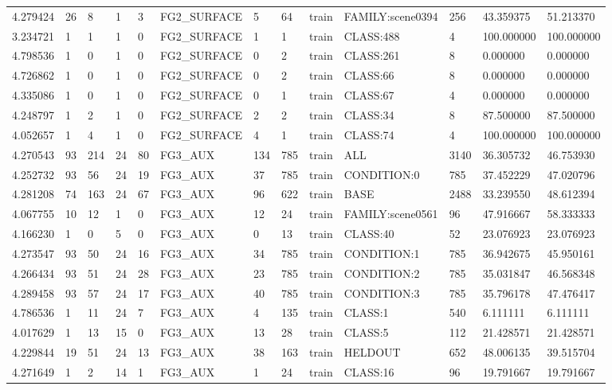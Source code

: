 \begin{tabular}{lllllllllllll}
4.279424 & 26 & 8 & 1 & 3 & FG2\_SURFACE & 5 & 64 & train & FAMILY:scene0394 & 256 & 43.359375 & 51.213370 \\
3.234721 & 1 & 1 & 1 & 0 & FG2\_SURFACE & 1 & 1 & train & CLASS:488 & 4 & 100.000000 & 100.000000 \\
4.798536 & 1 & 0 & 1 & 0 & FG2\_SURFACE & 0 & 2 & train & CLASS:261 & 8 & 0.000000 & 0.000000 \\
4.726862 & 1 & 0 & 1 & 0 & FG2\_SURFACE & 0 & 2 & train & CLASS:66 & 8 & 0.000000 & 0.000000 \\
4.335086 & 1 & 0 & 1 & 0 & FG2\_SURFACE & 0 & 1 & train & CLASS:67 & 4 & 0.000000 & 0.000000 \\
4.248797 & 1 & 2 & 1 & 0 & FG2\_SURFACE & 2 & 2 & train & CLASS:34 & 8 & 87.500000 & 87.500000 \\
4.052657 & 1 & 4 & 1 & 0 & FG2\_SURFACE & 4 & 1 & train & CLASS:74 & 4 & 100.000000 & 100.000000 \\
4.270543 & 93 & 214 & 24 & 80 & FG3\_AUX & 134 & 785 & train & ALL & 3140 & 36.305732 & 46.753930 \\
4.252732 & 93 & 56 & 24 & 19 & FG3\_AUX & 37 & 785 & train & CONDITION:0 & 785 & 37.452229 & 47.020796 \\
4.281208 & 74 & 163 & 24 & 67 & FG3\_AUX & 96 & 622 & train & BASE & 2488 & 33.239550 & 48.612394 \\
4.067755 & 10 & 12 & 1 & 0 & FG3\_AUX & 12 & 24 & train & FAMILY:scene0561 & 96 & 47.916667 & 58.333333 \\
4.166230 & 1 & 0 & 5 & 0 & FG3\_AUX & 0 & 13 & train & CLASS:40 & 52 & 23.076923 & 23.076923 \\
4.273547 & 93 & 50 & 24 & 16 & FG3\_AUX & 34 & 785 & train & CONDITION:1 & 785 & 36.942675 & 45.950161 \\
4.266434 & 93 & 51 & 24 & 28 & FG3\_AUX & 23 & 785 & train & CONDITION:2 & 785 & 35.031847 & 46.568348 \\
4.289458 & 93 & 57 & 24 & 17 & FG3\_AUX & 40 & 785 & train & CONDITION:3 & 785 & 35.796178 & 47.476417 \\
4.786536 & 1 & 11 & 24 & 7 & FG3\_AUX & 4 & 135 & train & CLASS:1 & 540 & 6.111111 & 6.111111 \\
4.017629 & 1 & 13 & 15 & 0 & FG3\_AUX & 13 & 28 & train & CLASS:5 & 112 & 21.428571 & 21.428571 \\
4.229844 & 19 & 51 & 24 & 13 & FG3\_AUX & 38 & 163 & train & HELDOUT & 652 & 48.006135 & 39.515704 \\
4.271649 & 1 & 2 & 14 & 1 & FG3\_AUX & 1 & 24 & train & CLASS:16 & 96 & 19.791667 & 19.791667 \\

\end{tabular}
